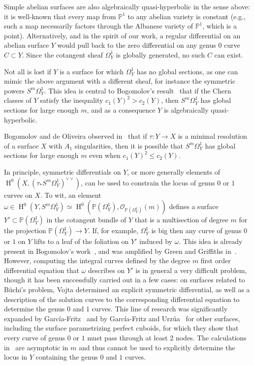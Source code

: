 \documentclass[12pt, reqno]{amsart}
\theoremstyle{definition}
\newcommand{\PP}{{\mathbb P}}
\newcommand{\sO}{{\mathscr O}}
\DeclareMathOperator{\HH}{H}
\newcommand{\isom}{\simeq}
\numberwithin{equation}{section}
\numberwithin{table}{section}
\begin{document}
Simple abelian surfaces are also algebraically quasi-hyperbolic in the sense above: it is well-known that every map from $\PP^1$ to any abelian variety is constant (e.g., such a map necessarily factors through the Albanese variety of $\PP^1$, which is a point). Alternatively, and in the spirit of our work, a regular differential on an abelian surface $Y$ would pull back to the zero differential on any genus $0$ curve $C\subset Y$. Since the cotangent sheaf $\Omega^1_Y$ is globally generated, no such $C$ can exist.

Not all is lost if $Y$ is a surface for which $\Omega^1_Y$ has no global sections, as one can mimic the above argument with a different sheaf, for instance  the symmetric powers $S^m\Omega^1_Y$. This idea is central to Bogomolov's result~\cite{Bogomolov} that if the Chern classes of $Y$ satisfy the inequality $c_1(Y)^2>c_2(Y)$, then $S^m\Omega^1_Y$ has global sections for large enough $m$, and as a consequence $Y$ is algebraically quasi-hyperbolic.

Bogomolov and de Oliveira observed in~\cite{BO} that if $\tau\colon Y\to X$ is a minimal resolution of a surface $X$ with $A_1$ singularities, then it is possible that $S^m\Omega^1_Y$ has global sections for large enough $m$ even when $c_1(Y)^2\leq c_2(Y)$.  

In principle, symmetric differentials on $Y$, or more generally elements of $\HH^0(X,(\tau_*S^m\Omega^1_Y)^{\vee\vee})$, can be used to constrain the locus of genus $0$ or $1$ curves on $X$.  To wit, an element $\omega \in \HH^0(Y,S^m\Omega^1_Y)\isom \HH^0(\PP(\Omega^1_Y),\sO_{\PP(\Omega^1_Y)}(m))$ defines a surface $Y'\subset \PP(\Omega^1_Y)$ in the cotangent bundle of $Y$ that is a multisection of degree $m$ for the projection $\PP(\Omega^1_Y) \to Y$. If, for example, $\Omega^1_Y$ is big then any curve of genus $0$ or $1$ on $Y$ lifts to a leaf of the foliation on $Y'$ induced by $\omega$. This idea is already present in Bogomolov's work~\cites{Bogomolov,Deschamps}, and was amplified by Green and Griffiths in~\cite{GreenGriffiths}. However, computing the integral curves defined by the degree $m$ first order differential equation that $\omega$ describes on $Y'$ is in general a very difficult problem, though it has been successfully carried out in a few cases: on surfaces related to B\"uchi's problem, Vojta \cite{Vojta2000} determined an explicit symmetric differential, as well as a description of the solution curves to the corresponding differential equation to determine the genus $0$ and $1$ curves. This line of research was significantly expanded by Garc\'ia-Fritz~\cites{GarciaFritz,GarciaFritzIJNT} and by Garc\'ia-Fritz and Urz\'ua~\cite{GarciaFritzUrzua} for other surfaces, including the surface parametrizing perfect cuboids, for which they show that every curve of genus $0$ or $1$ must pass through at least $2$ nodes. The calculations in~\cite{BO} are asymptotic in $m$ and thus cannot be used to explicitly determine the locus in $Y$ containing the genus $0$ and $1$ curves.\\
\end{document}
